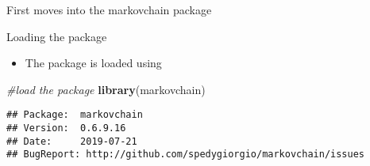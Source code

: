 \documentclass[ignorenonframetext,]{beamer}
\newenvironment{Shaded}{\begin{snugshade}}{\end{snugshade}}
\newcommand{\CommentTok}[1]{\textcolor[rgb]{0.56,0.35,0.01}{\textit{#1}}}
\newcommand{\KeywordTok}[1]{\textcolor[rgb]{0.13,0.29,0.53}{\textbf{#1}}}
\newcommand{\NormalTok}[1]{#1}
\providecommand{\tightlist}{%
  \setlength{\itemsep}{0pt}\setlength{\parskip}{0pt}}
\providecommand{\tightlist}{
  \setlength{\itemsep}{0pt}\setlength{\parskip}{0pt}
}
\begin{document}
\begin{frame}[fragile]{First moves into the markovchain package}
\protect\hypertarget{first-moves-into-the-markovchain-package}{}

\begin{block}{Loading the package}

\begin{itemize}
\tightlist
\item
  The package is loaded using
\end{itemize}

\begin{Shaded}
\begin{Highlighting}[]
\CommentTok{#load the package}
\KeywordTok{library}\NormalTok{(markovchain) }
\end{Highlighting}
\end{Shaded}

\begin{verbatim}
## Package:  markovchain
## Version:  0.6.9.16
## Date:     2019-07-21
## BugReport: http://github.com/spedygiorgio/markovchain/issues
\end{verbatim}

\end{block}

\end{frame}
\end{document}
